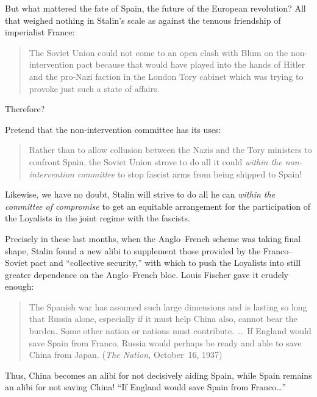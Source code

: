 But what mattered the fate of Spain, the future of the European revolution? All that weighed nothing in Stalin’s scale as against the tenuous friendship of imperialist France:

\begin{quotation}
  The Soviet Union could not come to an open clash with Blum on the non-intervention pact because that would have played into the hands of Hitler and the pro-Nazi faction in the London Tory cabinet which was trying to provoke just such a state of affairs.\endnotemark[\ref{en:GannesUSSR}]  
\end{quotation}

Therefore?

\smallskip
  
Pretend that the non-intervention committee has its uses:

\begin{quotation}
  Rather than to allow collusion between the Nazis and the Tory ministers to confront Spain, the Soviet Union strove to do all it could \emph{within the non-intervention committee} to stop fascist arms from being shipped to Spain!{\kern 0.5pt}\endnotemark[\ref{en:GannesUSSR}]  
\end{quotation}

Likewise, we have no doubt, Stalin will strive to do all he can \emph{within the committee of compromise} to get an equitable arrangement for the participation of the Loyalists in the joint regime with the fascists.

Precisely in these last months, when the Anglo--French scheme was taking final shape, Stalin found a new alibi to supplement those provided by the Franco--Soviet pact and ``collective security,'' with which to push the Loyalists into still greater dependence on the Anglo--French bloc. Louis Fischer gave it crudely enough:

\begin{quotation}
  The Spanish war has assumed such large dimensions and is lasting so long that Russia alone, especially if it must help China also, cannot bear the burden. Some other nation or nations must contribute. \dots\ If England would save Spain from Franco, Russia would perhaps be ready and able to save China from Japan. (\emph{The Nation,} October~16, 1937)
\end{quotation}

Thus, China becomes an alibi for not decisively aiding Spain, while Spain remains an alibi for not saving China! ``If England would save Spain from Franco\dots''

